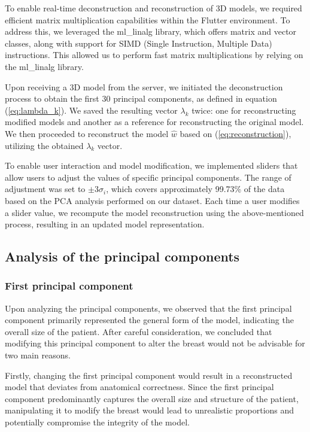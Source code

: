 To enable real-time deconstruction and reconstruction of 3D models, we required efficient matrix multiplication capabilities within the Flutter environment. To address this, we leveraged the ml\_linalg library, 
which offers matrix and vector classes, along with support for SIMD (Single Instruction, Multiple Data) instructions. This allowed us to perform fast matrix multiplications by relying on the ml\_linalg library.

Upon receiving a 3D model from the server, we initiated the deconstruction process to obtain the first 30 principal components, as defined in equation (\ref{eq:lambda_k}). We saved the resulting vector 
$\lambda_k$ twice: one for reconstructing modified models and another as a reference for reconstructing the original model. We then proceeded to reconstruct the model $\hat{w}$ based on 
(\ref{eq:reconstruction}), utilizing the obtained $\lambda_k$ vector.

To enable user interaction and model modification, we implemented sliders that allow users to adjust the values of specific principal components. The range of adjustment was set to $\pm 3\sigma_i$, 
which covers approximately 99.73\% of the data based on the PCA analysis performed on our dataset. Each time a user modifies a slider value, we recompute the model reconstruction using the 
above-mentioned process, resulting in an updated model representation.

\subsection{Analysis of the principal components}

\subsubsection{First principal component}

Upon analyzing the principal components, we observed that the first principal component primarily represented the general form of the model, indicating the overall size of the patient. 
After careful consideration, we concluded that modifying this principal component to alter the breast would not be advisable for two main reasons.

Firstly, changing the first principal component would result in a reconstructed model that deviates from anatomical correctness. Since the first principal component predominantly captures the 
overall size and structure of the patient, manipulating it to modify the breast would lead to unrealistic proportions and potentially compromise the integrity of the model.

